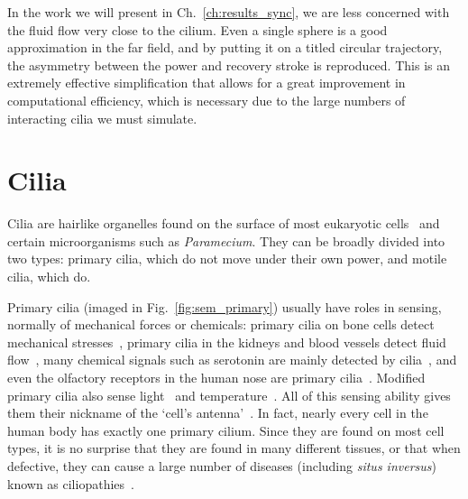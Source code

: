 In the work we will present in Ch.~\ref{ch:results_sync}, we are less concerned with the fluid flow very close to the cilium. Even a single sphere is a good approximation in the far field, and by putting it on a titled circular trajectory, the asymmetry between the power and recovery stroke is reproduced. This is an extremely effective simplification that allows for a great improvement in computational efficiency, which is necessary due to the large numbers of interacting cilia we must simulate.



\section{Cilia}

Cilia are hairlike organelles found on the surface of most eukaryotic cells~ and certain microorganisms such as \textit{Paramecium}. They can be broadly divided into two types: primary cilia, which do not move under their own power, and motile cilia, which do.

Primary cilia (imaged in Fig.~\ref{fig:sem_primary}) usually have roles in sensing, normally of mechanical forces or chemicals: primary cilia on bone cells detect mechanical stresses~, primary cilia in the kidneys and blood vessels detect fluid flow~, many chemical signals such as serotonin are mainly detected by cilia~, and even the olfactory receptors in the human nose are primary cilia~. Modified primary cilia also sense light~ and temperature~. All of this sensing ability gives them their nickname of the `cell's antenna'~. In fact, nearly every cell in the human body has exactly one primary cilium. Since they are found on most cell types, it is no surprise that they are found in many different tissues, or that when defective, they can cause a large number of diseases (including \textit{situs inversus}) known as ciliopathies~.


